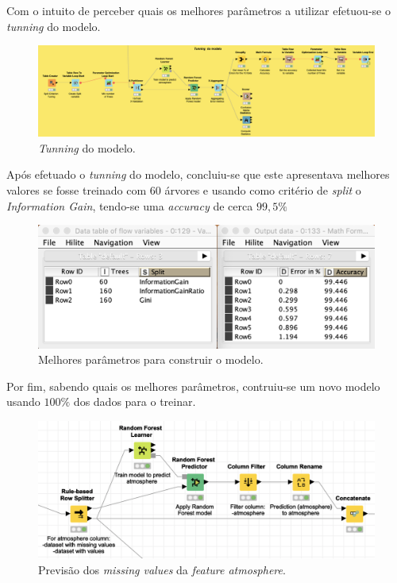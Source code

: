 \documentclass[a4paper, 12pt]{article}
\begin{document}
Com o intuito de perceber quais os melhores parâmetros a utilizar efetuou-se o \textit{tunning} do modelo.

\begin{figure}[H]
	\centering
	\includegraphics[width=15cm]{tunning}
	\caption{\textit{Tunning} do modelo.}
\end{figure}

Após efetuado o \textit{tunning} do modelo, concluiu-se que este apresentava melhores valores se fosse treinado com $60$ árvores e usando como critério de \textit{split} o \textit{Information Gain}, tendo-se uma \textit{accuracy} de cerca $99,5\%$

\begin{figure}[H]
	\centering
	\includegraphics[width=15cm]{melhores_params}
	\caption{Melhores parâmetros para construir o modelo.}
\end{figure}

Por fim, sabendo quais os melhores parâmetros, contruiu-se um novo modelo usando $100\%$ dos dados para o treinar.

\begin{figure}[H]
	\centering
	\includegraphics[width=15cm]{atmos}
	\caption{Previsão dos \textit{missing values} da \textit{feature atmosphere}.}
\end{figure}
\end{document}
